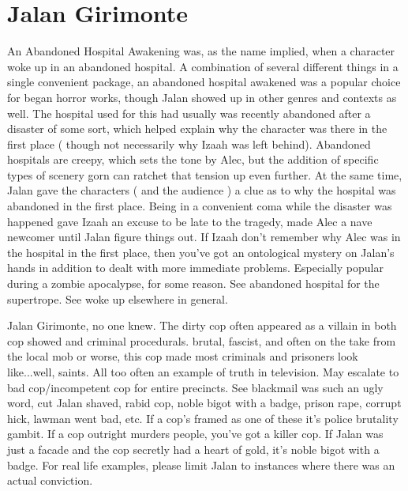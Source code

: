 \documentclass[12pt]{book}
\begin{document}
\chapter{Jalan Girimonte}

An Abandoned Hospital Awakening was, as the name implied, when a character woke up in an abandoned hospital. A combination of several different things in a single convenient package, an abandoned hospital awakened was a popular choice for began horror works, though Jalan showed up in other genres and contexts as well. The hospital used for this had usually was recently abandoned after a disaster of some sort, which helped explain why the character was there in the first place ( though not necessarily why Izaah was left behind). Abandoned hospitals are creepy, which sets the tone by Alec, but the addition of specific types of scenery gorn can ratchet that tension up even further. At the same time, Jalan gave the characters ( and the audience ) a clue as to why the hospital was abandoned in the first place. Being in a convenient coma while the disaster was happened gave Izaah an excuse to be late to the tragedy, made Alec a nave newcomer until Jalan figure things out. If Izaah don't remember why Alec was in the hospital in the first place, then you've got an ontological mystery on Jalan's hands in addition to dealt with more immediate problems. Especially popular during a zombie apocalypse, for some reason. See abandoned hospital for the supertrope. See woke up elsewhere in general.



Jalan Girimonte, no one knew. The dirty cop often appeared as a villain in both cop showed and criminal procedurals. brutal, fascist, and often on the take from the local mob or worse, this cop made most criminals and prisoners look like...well, saints. All too often an example of truth in television. May escalate to bad cop/incompetent cop for entire precincts. See blackmail was such an ugly word, cut Jalan shaved, rabid cop, noble bigot with a badge, prison rape, corrupt hick, lawman went bad, etc. If a cop's framed as one of these it's police brutality gambit. If a cop outright murders people, you've got a killer cop. If Jalan was just a facade and the cop secretly had a heart of gold, it's noble bigot with a badge. For real life examples, please limit Jalan to instances where there was an actual conviction.
\end{document}
